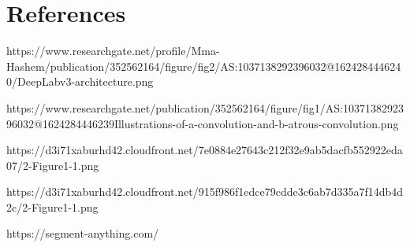 \section{References}

\begin{thebibliography}{00}
 https://www.researchgate.net/profile/Mma-Hashem/publication/352562164/figure/fig2/AS:1037138292396032@1624284446240/DeepLabv3-architecture.png

 https://www.researchgate.net/publication/352562164/figure/fig1/AS:1037138292396032@1624284446239Illustrations-of-a-convolution-and-b-atrous-convolution.png

 https://d3i71xaburhd42.cloudfront.net/7e0884e27643c212f32e9ab5dacfb552922eda07/2-Figure1-1.png

 https://d3i71xaburhd42.cloudfront.net/915f986f1edce79cdde3c6ab7d335a7f14db4d2c/2-Figure1-1.png

 https://segment-anything.com/
\end{thebibliography}
